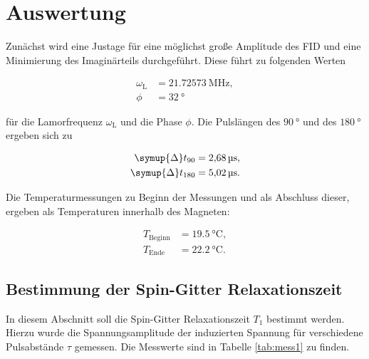 \section{Auswertung}
\label{sec:Auswertung}

Zunächst wird eine Justage für eine möglichst große Amplitude des FID und eine Minimierung des Imaginärteils durchgeführt. 
Diese führt zu folgenden Werten

\begin{align}
  \omega_\text{L} &= \SI{21.72573}{\mega\hertz},\\
  \phi &= \SI{32}{\degree}
\end{align}

für die Lamorfrequenz $\omega_\text{L}$ und die Phase $\phi$. Die Pulslängen des $\SI{90}{\degree}$ und des $\SI{180}{\degree}$
ergeben sich zu 

\begin{align}
  \symup{\Delta} t_{90} &= \SI{2.68}{\micro\second},\\
  \symup{\Delta} t_{180} &= \SI{5.02}{\micro\second}.
\end{align}

Die Temperaturmessungen zu Beginn der Messungen und als Abschluss dieser, ergeben als Temperaturen innerhalb des Magneten: 

\begin{align}
  T_\text{Beginn} &= \SI{19.5}{\celsius},\\
  T_\text{Ende} &= \SI{22.2}{\celsius}.
\end{align}

\subsection{Bestimmung der Spin-Gitter Relaxationszeit}

In diesem Abschnitt soll die Spin-Gitter Relaxationszeit $T_1$ bestimmt werden. Hierzu wurde die Spannungsamplitude der 
induzierten Spannung für verschiedene Pulsabstände $\tau$ gemessen. Die Messwerte sind in Tabelle \ref{tab:mess1} zu finden.

